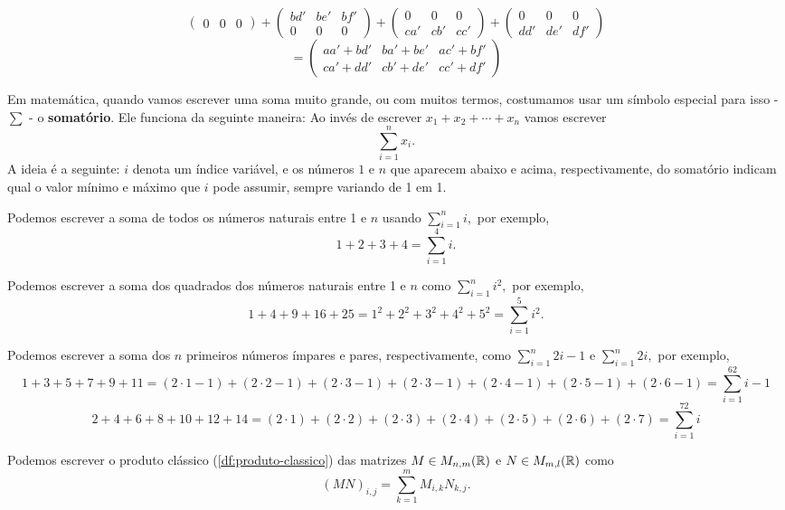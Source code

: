 \begin{ex}
\[\begin{pmatrix}
0 & 0 & 0
\end{pmatrix}+\begin{pmatrix}
bd' & be' & bf'\\
0&0&0
\end{pmatrix}+\begin{pmatrix}
0&0&0\\
ca' &cb' & cc'
\end{pmatrix}+\begin{pmatrix}
0&0&0\\
dd' & de' & df'
\end{pmatrix}\]
\[=\begin{pmatrix}
aa'+bd' &ba'+be' & ac'+bf'\\
ca'+dd' & cb'+de' & cc'+df'
\end{pmatrix}\]
\end{ex}

\begin{rmk}
	Em matemática, quando vamos escrever uma soma muito grande, ou com muitos termos, costumamos usar um símbolo especial para isso - $\sum$ - o \textbf{somatório}. Ele funciona da seguinte maneira: Ao invés de escrever $x_1+x_2+\cdots+x_n$ vamos escrever
	\[\sum_{i=1}^n x_i.\] A ideia é a seguinte: $i$ denota um índice variável, e os números $1$ e $n$ que aparecem abaixo e acima, respectivamente, do somatório indicam qual o valor mínimo e máximo que $i$ pode assumir, sempre variando de 1 em 1.
\end{rmk}

\begin{ex}
	Podemos escrever a soma de todos os números naturais entre 1 e $n$ usando \(\sum_{i=1}^ni,\) por exemplo,
	\[1+2+3+4=\sum_{i=1}^4i.\]
	
	Podemos escrever a soma dos quadrados dos números naturais entre 1 e $n$ como \(\sum_{i=1}^ni^2,\) por exemplo,
	\[1+4+9+16+25=1^2+2^2+3^2+4^2+5^2=\sum_{i=1}^5i^2.\]
	
	Podemos escrever a soma dos $n$ primeiros números ímpares e pares, respectivamente, como $\sum_{i=1}^n 2i-1\text{ e }\sum_{i=1}^n2i,$ por exemplo,
	\[1+3+5+7+9+11 = (2\cdot1-1)+(2\cdot2-1)+(2\cdot3-1)+(2\cdot3-1)+(2\cdot4-1)+(2\cdot5-1)+(2\cdot6-1) = \sum_{i=1}^62i-1\]\[2+4+6+8+10+12+14 = (2\cdot 1)+(2\cdot2)+(2\cdot3)+(2\cdot4)+(2\cdot5)+(2\cdot6)+(2\cdot7 )= \sum_{i=1}^72i\]
	
	Podemos escrever o produto clássico (\ref{df:produto-classico}) das matrizes $M\in M_{n,m}(\mathbb R)$ e $N\in M_{m,l}(\mathbb R)$ como $$(MN)_{i,j}=\sum_{k=1}^{m}M_{i,k}N_{k,j}.$$
\end{ex}

